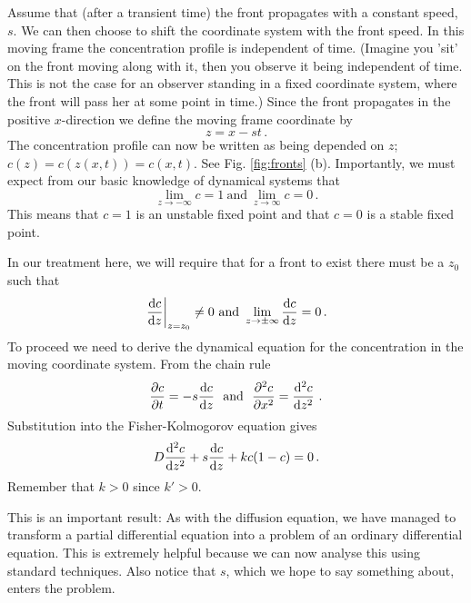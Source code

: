 Assume that (after a transient time) the front propagates with a
constant speed, $s$. We can then choose to shift the coordinate system 
with the front speed. In this moving frame the concentration profile is
independent of time. (Imagine you 'sit' on the front moving along with it, 
then you observe it being independent of time. This is not the case for an observer 
standing in a fixed coordinate system, where the front will pass her 
at some point in time.) Since the front propagates in the positive $x$-direction 
we define the moving frame coordinate by
\begin{equation}
  z = x - st \, .
\end{equation}
The concentration profile can now be written as being depended on $z$; 
$c(z)= c(z(x,t))=c(x,t)$. See Fig. \ref{fig:fronts} (b). Importantly, we must expect 
from our basic knowledge of dynamical systems that
\begin{equation}
  \lim_{z \rightarrow -\infty} c = 1  \ \text{and} \   \lim_{z \rightarrow
    \infty} c = 0 \, .
\end{equation}
This means that $c=1$ is an unstable fixed point and that $c=0$ is a stable fixed point. 

In our treatment here, we will require that for a front to exist there must be a $z_0$ such that
\begin{eqnarray}
	\left.\frac{\d c}{\d z} \right|_{z=z_0} \neq 0 
	\ \text{and} \ 
	\lim_{z \rightarrow \pm \infty} \frac{\d c}{\d z} = 0 \, .
\end{eqnarray}
To proceed we need to derive the dynamical equation for the concentration in the 
moving coordinate system. From the chain rule
\begin{equation}
  \frac{\partial c}{\partial t} = -s \frac{\mathrm{d} c}{\mathrm{d} z} \ \
  \text{and} \ \
  \frac{\partial^2 c}{\partial x^2} = \frac{\mathrm{d}^2 c}{\mathrm{d} z^2} \ . 
\end{equation}
Substitution into the Fisher-Kolmogorov equation gives 
\begin{equation}
  \label{eq:fkmvframe}
  D\frac{\mathrm{d}^2c}{\mathrm{d} z^2} + s\frac{\mathrm{d} c}{\mathrm{d} z} + kc(1-c) = 0 \, .
\end{equation}
Remember that $k>0$ since $k'>0$. 

This is an important result: As with the diffusion equation, we have managed to transform a 
partial differential equation into a problem of an ordinary differential equation. 
This is extremely helpful because we can now analyse this using
standard techniques. Also notice that $s$, which we hope to say something
about, enters the problem. 

